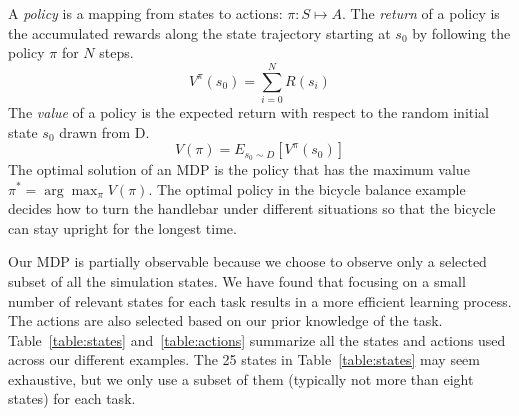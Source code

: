 A \emph{policy} is a mapping from states to actions: $\pi : S \mapsto A$. The \emph{return} of a policy is the accumulated rewards along the state trajectory starting at $s_0$ by following the policy $\pi$ for $N$ steps.
\begin{displaymath}
V^\pi(s_0)=\sum_{i=0}^N{R(s_i)}
\end{displaymath}
The \emph{value} of a policy is the expected return with respect to the random initial state $s_0$ drawn from D.
\begin{equation}
V(\pi)=E_{s_0\sim D}[V^\pi(s_0)]
\label{eq:policyValue}
\end{equation}
The optimal solution of an MDP is the policy that has the maximum value $\pi^*=\arg\max_\pi V(\pi)$. The optimal policy in the bicycle balance example decides how to turn the handlebar under different situations so that the bicycle can stay upright for the longest time.

Our MDP is partially observable because we choose to observe only a selected subset of all the simulation states. We have found that focusing on a small number of relevant states for each task results in a more efficient learning process. The actions are also selected based on our prior knowledge of the task. Table~\ref{table:states} and~\ref{table:actions} summarize all the states and actions used across our different examples. The 25 states in Table~\ref{table:states} may seem exhaustive, but we only use a subset of them (typically not more than eight states) for each task.

